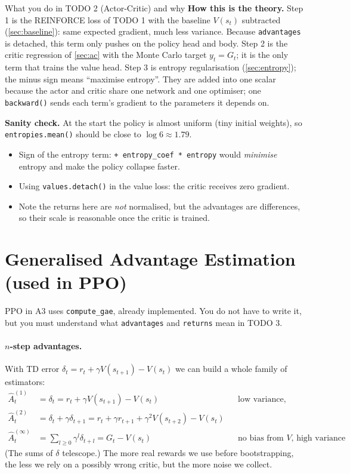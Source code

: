 \documentclass[11pt,a4paper]{article}
\newcommand{\hA}{\hat{A}}
\newcommand{\code}[1]{\texttt{#1}}
\begin{document}
\begin{todobox}{What you do in TODO 2 (Actor-Critic) and why}
\textbf{How this is the theory.}
Step 1 is the REINFORCE loss of TODO 1 with the baseline $V(s_t)$ subtracted (\cref{sec:baseline}): same expected gradient, much less variance. Because \code{advantages} is detached, this term only pushes on the policy head and body.
Step 2 is the critic regression of \cref{sec:ac} with the Monte Carlo target $y_t=G_t$; it is the only term that trains the value head.
Step 3 is entropy regularisation (\cref{sec:entropy}); the minus sign means \enquote{maximise entropy}.
They are added into one scalar because the actor and critic share one network and one optimiser; one \code{backward()} sends each term's gradient to the parameters it depends on.

\textbf{Sanity check.} At the start the policy is almost uniform (tiny initial weights), so \code{entropies.mean()} should be close to $\log 6\approx1.79$.
\end{todobox}

\begin{pitfall}
\begin{itemize}[nosep,leftmargin=*]
  \item Sign of the entropy term: \code{+ entropy\_coef * entropy} would \emph{minimise} entropy and make the policy collapse faster.
  \item Using \code{values.detach()} in the value loss: the critic receives zero gradient.
  \item Note the returns here are \emph{not} normalised, but the advantages are differences, so their scale is reasonable once the critic is trained.
\end{itemize}
\end{pitfall}

\section{Generalised Advantage Estimation (used in PPO)}\label{sec:gae}

PPO in A3 uses \code{compute\_gae}, already implemented. You do not have to write it, but you must understand what \code{advantages} and \code{returns} mean in TODO 3.

\paragraph{$n$-step advantages.}
With TD error $\delta_t = r_t+\gamma V(s_{t+1}) - V(s_t)$ we can build a whole family of estimators:
\begin{align*}
  \hA^{(1)}_t &= \delta_t = r_t+\gamma V(s_{t+1})-V(s_t) &&\text{low variance, high bias}\\
  \hA^{(2)}_t &= \delta_t+\gamma\delta_{t+1} = r_t+\gamma r_{t+1}+\gamma^2V(s_{t+2})-V(s_t)\\
  \hA^{(\infty)}_t &= \textstyle\sum_{l\ge0}\gamma^l\delta_{t+l} = G_t - V(s_t) &&\text{no bias from }V\text{, high variance}
\end{align*}
(The sums of $\delta$ telescope.) The more real rewards we use before bootstrapping, the less we rely on a possibly wrong critic, but the more noise we collect.
\end{document}
